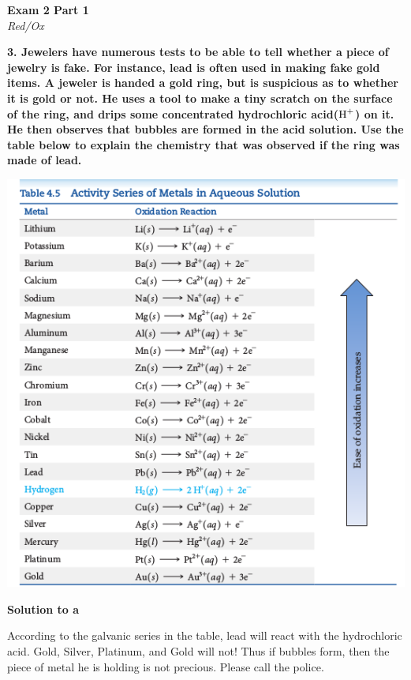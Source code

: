 \documentclass{article}
\begin{document}
    \begin{center}
        \textbf{Exam 2 Part 1}\\
        \textit{Red/Ox}
    \end{center}
    \textbf{3. Jewelers have numerous tests to be able to tell whether a piece of jewelry is fake. For instance, lead is often used in making fake gold items. A jeweler is handed a gold ring, but is suspicious as to whether it is gold or not. He uses a tool to make a tiny scratch on the surface of the ring, and drips some concentrated hydrochloric acid($\ce{H^{+}}$) on it. He then observes that bubbles are formed in the acid solution. Use the table below to explain the chemistry that was observed if the ring was made of lead.}
    \begin{center}
        \includegraphics[scale=0.35]{table_4_5}\\[1cm]
    \end{center}

    \textbf{Solution to a}

    According to the galvanic series in the table, lead will react with the hydrochloric acid. Gold, Silver, Platinum, and Gold will not! Thus if bubbles form, then the piece of metal he is holding is not precious. Please call the police.
\end{document}
